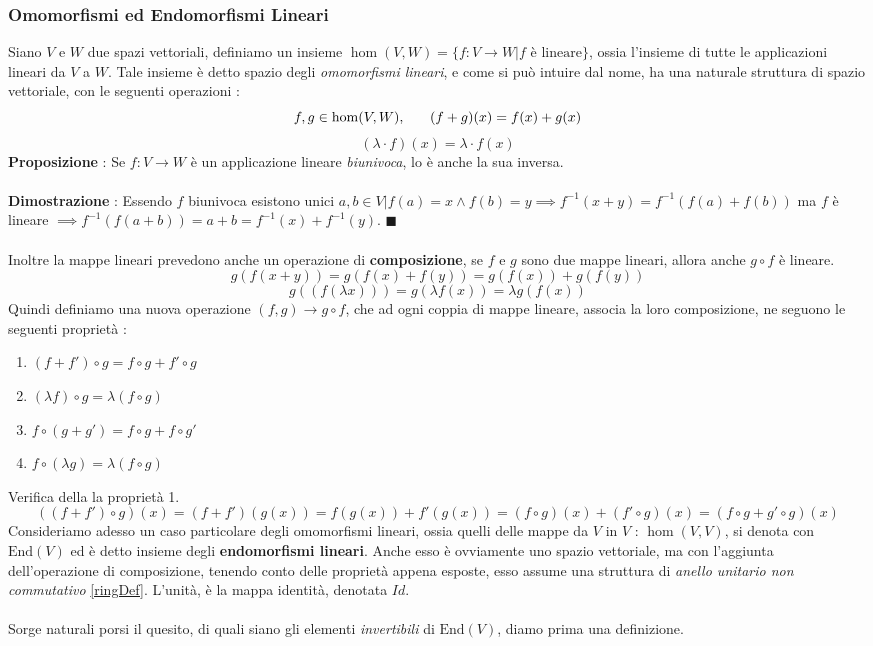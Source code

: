 \documentclass[12pt, letterpaper]{article}
\newcommand{\acc}{\\\hphantom{}\\}
\newcommand{\End}{{\text{End}}}
\begin{document}
\subsubsection{Omomorfismi ed Endomorfismi Lineari}
Siano \(V\) e \(W\) due spazi vettoriali, definiamo un insieme \(\hom(V,W)=\{f:V\rightarrow W| f \text{ è lineare}\}\), 
ossia l'insieme di tutte le applicazioni lineari da \(V\) a \(W\). Tale insieme è detto spazio degli \textit{omomorfismi 
lineari}, e come si può intuire dal nome, ha una naturale struttura di spazio vettoriale, con le seguenti operazioni :
$$f,g\in\hom(V,W),\text{\hphantom{text}}(f+g)(x)=f(x)+g(x)$$$$(\lambda\cdot f)(x)=\lambda\cdot f(x)$$
\textbf{Proposizione} : Se \(f:V\rightarrow W\) è un applicazione lineare \textit{biunivoca}, lo è anche la sua inversa.\acc 
\textbf{Dimostrazione} : Essendo \(f\) biunivoca esistono unici \(a,b\in V|f(a)=x\land f(b)=y\implies 
f^{-1}(x+y)=f^{-1}(f(a)+f(b))\) ma \(f\) è lineare \(\implies f^{-1}(f(a+b))=a+b=f^{-1}(x)+f^{-1}(y)\). \(\blacksquare\)\acc 
Inoltre la mappe lineari prevedono anche un operazione di \textbf{composizione}, se \(f\) e \(g\) sono due mappe 
lineari, allora anche \(g\circ f\) è lineare.$$g(f(x+y))=g(f(x)+f(y))=g(f(x))+g(f(y))$$
$$g((f(\lambda x)))=g(\lambda f(x))=\lambda g(f(x))$$
Quindi definiamo una nuova operazione \((f,g)\rightarrow g\circ f\), che ad ogni coppia di mappe lineare, associa la loro 
composizione, ne seguono le seguenti proprietà :\begin{enumerate}
    \item \((f+f')\circ g=f\circ g+f'\circ g\)
    \item \((\lambda f)\circ g = \lambda(f\circ g)\)
    \item \(f\circ (g+g')=f\circ g+f\circ g'\)
    \item \(f\circ (\lambda g)=\lambda(f\circ g)\)
\end{enumerate}
Verifica della la proprietà 1. $$((f+f')\circ g)(x)=(f+f')(g(x))=f(g(x))+f'(g(x))=(f\circ g)(x)+(f'\circ g)(x)
=(f\circ g+g'\circ g)(x)$$
Consideriamo adesso un caso particolare degli omomorfismi lineari, ossia quelli delle mappe 
da \(V\) in \(V\) : \(\hom(V,V)\), si denota con \(\End(V)\) ed è detto insieme degli \textbf{endomorfismi lineari}. Anche 
esso è ovviamente uno spazio vettoriale, ma con l'aggiunta dell'operazione di composizione, tenendo conto 
delle proprietà appena esposte, esso assume 
una struttura di \textit{anello unitario non commutativo} \ref{ringDef}. L'unità, è la mappa identità, denotata 
 \(Id\).\acc 
 Sorge naturali porsi il quesito, di quali siano gli elementi \textit{invertibili} di \(\End(V)\), diamo prima una definizione.\acc 
\end{document}
